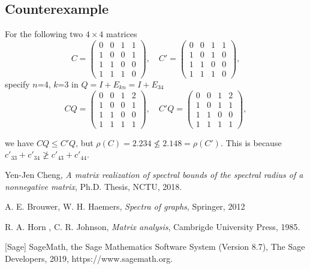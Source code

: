 \documentclass{article}
\theoremstyle{plain}
\theoremstyle{definition}
\begin{document}
\subsection{Counterexample}
    For the following two $4\times 4$ matrices
    $$C=\begin{pmatrix}
    0 & 0 & 1 & 1\\
    1 & 0 & 0 & 1\\
    1 & 1 & 0 & 0\\
    1 & 1 & 1 & 0
    \end{pmatrix},\quad C'=\begin{pmatrix}
    0 & 0 & 1 & 1\\
    1 & 0 & 1 &  0\\
    1 & 1 & 0 & 0\\
    1 & 1 & 1 & 0
    \end{pmatrix},$$ 
    specify $n$=4, $k$=3 in $Q = I +E_{kn} = I + E_{34}$  
    $$CQ=\begin{pmatrix}
    0 & 0 & 1 & 2\\
    1 & 0 & 0 & 1\\
    1 & 1 & 0 & 0\\
    1 & 1 & 1 & 1
    \end{pmatrix},\quad C'Q=\begin{pmatrix}
    0 & 0 & 1 & 2\\
    1 & 0 & 1 & 1\\
    1 & 1 & 0 & 0\\
    1 & 1 & 1 & 1
    \end{pmatrix},$$

    we have $CQ\leq C'Q$, but 
    $\rho(C)=2.234\not\leq 2.148= \rho(C')$. 
    This is because $c'_{33}+c'_{34}\not\geq c'_{43}+c'_{44}$. 


    

\begin{thebibliography}{20}
\normalsize
{}

Yen-Jen Cheng, {\it  A matrix realization of spectral bounds
of the spectral radius of a nonnegative matrix}, Ph.D. Thesis, NCTU, 2018.

A. E. Brouwer, W. H. Haemers, {\it Spectra of graphs}, Springer, 2012

R. A. Horn , C. R. Johnson, {\it Matrix analysis}, Cambrigde University Press, 1985.

[Sage] SageMath, the Sage Mathematics Software System (Version 8.7),
       The Sage Developers, 2019, https://www.sagemath.org.  %

\end{thebibliography}
\end{document}
